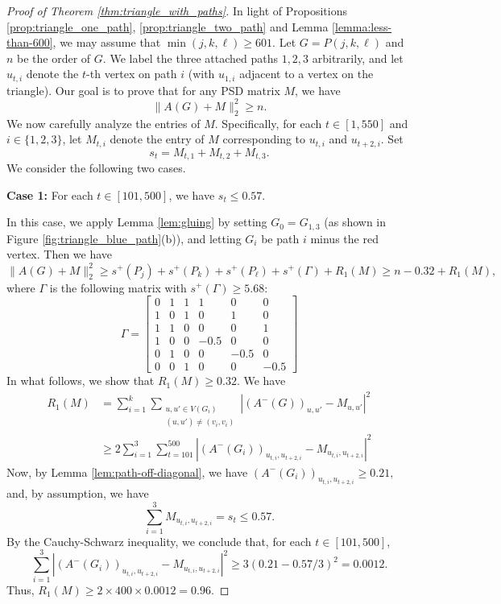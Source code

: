 \documentclass{article}
\newcommand{\abs}[1]{|#1|}
\newcommand{\norm}[1]{\lVert#1\rVert}
\begin{document}
\begin{proof}[Proof of Theorem \ref{thm:triangle_with_paths}]
In light of Propositions \ref{prop:triangle_one_path}, \ref{prop:triangle_two_path} and Lemma \ref{lemma:less-than-600}, we may assume that $\min(j, k, \ell) \geq 601$. Let $G = P(j, k, \ell)$ and $n$ be the order of $G$. We label the three attached paths $1,2,3$ arbitrarily, and let $u_{t,i}$ denote the $t$-th vertex on path $i$ (with $u_{1,i}$ adjacent to a vertex on the triangle). Our goal is to prove that for any PSD matrix $M$, we have
\[\norm{A(G) + M}_2^2 \geq n.\]
We now carefully analyze the entries of $M$. Specifically, for each $t \in [1, 550]$ and $i \in \{1,2,3\}$, let $M_{t, i}$ denote the entry of $M$ corresponding to $u_{t, i}$ and $u_{t + 2, i}$. Set
    \[s_t = M_{t,1} + M_{t, 2} + M_{t, 3}.\]
We consider the following two cases.
  
\textbf{Case 1:} For each $t \in [101, 500]$, we have $s_t \leq 0.57$.

In this case, we apply Lemma \ref{lem:gluing} by setting $G_0=G_{1,3}$ (as shown in Figure \ref{fig:triangle_blue_path}(b)), and letting $G_i$ be path $i$ minus the red vertex. Then we have
\[\norm{A(G) + M}_2^2  \geq s^+(P_j) + s^+(P_k) + s^+(P_{\ell}) + s^+(\Gamma) + R_1(M)\ge n - 0.32 + R_1(M),\]
where $\Gamma$ is the following matrix with $s^+(\Gamma) \geq 5.68$:
\[\Gamma = \begin{bmatrix}
        0 & 1 & 1 & 1 & 0 & 0\\
        1 & 0 & 1 & 0 & 1 & 0\\
        1 & 1 & 0 & 0 & 0 & 1\\
        1 & 0 & 0 & -0.5 & 0 & 0 \\
        0 & 1 & 0 & 0 & -0.5 & 0 \\
        0 & 0 & 1 & 0 & 0 & -0.5
    \end{bmatrix}\]
In what follows, we show that $R_1(M)\ge 0.32$. We have 
\begin{align*}
    R_1(M) & = \sum_{i = 1}^k \sum_{\substack{u, u' \in V(G_i) \\ (u, u') \neq (v_i, v_i)}} \abs{(A^-(G))_{u, u'} - M_{u, u'}}^2\\
    & \ge 2 \sum_{i = 1}^3 \sum_{t = 101}^{500} \abs{(A^-(G_i))_{u_{t, i}, u_{t + 2, i}} - M_{u_{t, i}, u_{t + 2, i}}}^2
\end{align*}
Now, by Lemma \ref{lem:path-off-diagonal}, we have $(A^-(G_i))_{u_{t, i}, u_{t + 2, i}} \geq 0.21,$
and, by assumption, we have
\[\sum_{i = 1}^3 M_{u_{t, i}, u_{t + 2, i}} = s_t \leq 0.57.\]
By the Cauchy-Schwarz inequality, we conclude that, for each $t \in [101,500]$, 
\[\sum_{i = 1}^3 \abs{(A^-(G_i))_{u_{t, i}, u_{t + 2, i}} - M_{u_{t, i}, u_{t + 2, i}}}^2 \geq 3  (0.21 - 0.57 / 3)^2 =  0.0012.\]
Thus, $R_1(M) \geq 2 \times 400 \times 0.0012 = 0.96.$


\end{proof}
\end{document}
